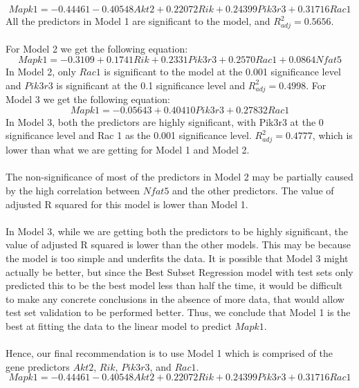 \documentclass{article}
\begin{document}
\begin{equation}
	Mapk1 = -0.44461-0.40548Akt2+0.22072Rik+0.24399Pik3r3+0.31716Rac1
	\label{eq:Model1}
\end{equation}
All the predictors in Model 1 are significant to the model, and $R^2_{adj}=0.5656$.\\
\null\\
For Model 2 we get the following equation:
\begin{equation}
	Mapk1=-0.3109+0.1741Rik+0.2331Pik3r3+0.2570Rac1+0.0864Nfat5
	\label{eq:Model2}
\end{equation}
In Model 2, only $Rac1$ is significant to the model at the 0.001 significance level and $Pik3r3$ is significant at the 0.1 significance level and $R^2_{adj}=0.4998$.
For Model 3 we get the following equation:
\begin{equation}
	Mapk1=-0.05643+0.40410Pik3r3+0.27832Rac1
	\label{eq:Model3}
\end{equation}
In Model 3, both the predictors are highly significant, with Pik3r3 at the 0 significance level and Rac 1 as the 0.001 significance level. $R^2_{adj}=0.4777$, which is lower than what we are getting for Model 1 and Model 2. \\
\null\\
The non-significance of most of the predictors in Model 2 may be partially caused by the high correlation between $Nfat5$ and the other predictors. The value of adjusted R squared for this model is lower than Model 1.\\
\null\\
In Model 3, while we are getting both the predictors to be highly significant, the value of adjusted R squared is lower than the other models. This may be because the model is too simple and underfits the data. It is possible that Model 3 might actually be better, but since the Best Subset Regression model with test sets only predicted this to be the best model less than half the time, it would be difficult to make any concrete conclusions in the absence of more data, that would allow test set validation to be performed better. Thus, we conclude that Model 1 is the best at fitting the data to the linear model to predict $Mapk1$.\\
\null\\
Hence, our final recommendation is to use Model 1 which is comprised of the gene predictors $Akt2$, $Rik$, $Pik3r3$, and $Rac1$.
\begin{equation}
	Mapk1 = -0.44461-0.40548Akt2+0.22072Rik+0.24399Pik3r3+0.31716Rac1
	\label{eq:Model1}
\end{equation}
\end{document}
